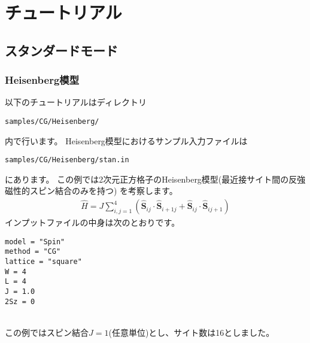 \chapter{チュートリアル}
\label{Ch:model}
\section{スタンダードモード}
\label{Sec:StandardMode}

\subsection{Heisenberg模型}

以下のチュートリアルはディレクトリ
\begin{verbatim}
samples/CG/Heisenberg/
\end{verbatim}
内で行います。
Heisenberg模型におけるサンプル入力ファイルは
\begin{verbatim}
samples/CG/Heisenberg/stan.in
\end{verbatim}
にあります。
この例では2次元正方格子のHeisenberg模型(最近接サイト間の反強磁性的スピン結合のみを持つ)
を考察します。
\begin{align}
  {\hat H} = J \sum_{i,j=1}^{4}(
  {\hat {\boldsymbol S}}_{i j} \cdot {\hat {\boldsymbol S}}_{i+1 j} +
  {\hat {\boldsymbol S}}_{i j} \cdot {\hat {\boldsymbol S}}_{i j+1}
  )
\end{align}
インプットファイルの中身は次のとおりです。
\\
\begin{minipage}{10cm}
\begin{screen}
\begin{verbatim}
model = "Spin"
method = "CG"
lattice = "square"
W = 4
L = 4
J = 1.0
2Sz = 0
\end{verbatim}
\end{screen}
\end{minipage}
%
\\
この例ではスピン結合$J=1$(任意単位)とし、サイト数は16としました。

